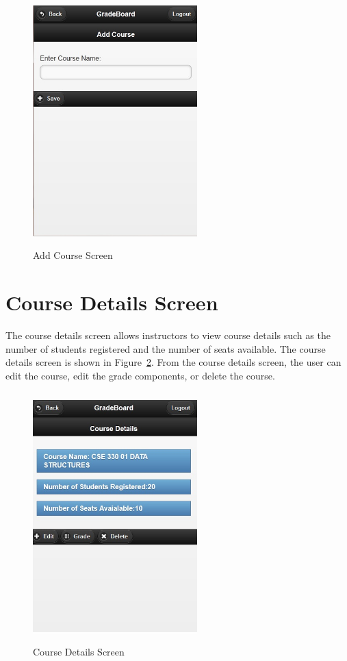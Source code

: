\vspace{3em}
\begin{figure}[H]
\begin{center}
\includegraphics[height=3.8in,width=2.5in]{images/addcourse_screen.jpg}
\caption{Add Course Screen}
\label{fig:addcourse_screen}
\end{center}
\end{figure}

\newpage
\section{Course Details Screen}
The course details screen allows instructors to view course details such as the number of students registered and the number of seats available. The course details screen is shown in Figure~\ref{fig:coursedetails_screen}. From the course details screen, the user can edit the course, edit the grade components, or delete the course.

\vspace{3em}
\begin{figure}[H]
\begin{center}
\includegraphics[height=3.8in,width=2.5in]{images/coursedetails_screen.jpg}
\caption{Course Details Screen}
\label{fig:coursedetails_screen}
\end{center}
\end{figure}

